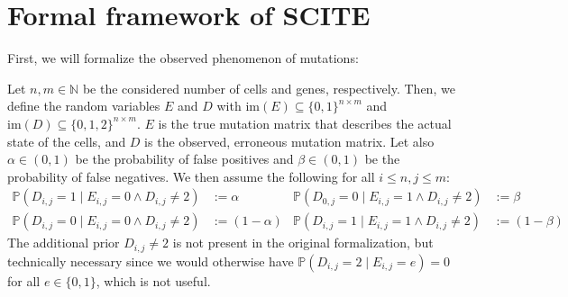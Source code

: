 \section{Formal framework of SCITE}

First, we will formalize the observed phenomenon of mutations:


\begin{definition}
    \label{def:mutmatrix}
    Let $n, m \in \mathbb{N}$ be the considered number of cells and genes, respectively. Then, we define the random variables $E$ and $D$ with $\mathrm{im}(E) \subseteq \{0,1\}^{n \times m}$ and $\mathrm{im}(D) \subseteq \{0, 1, 2\}^{n \times m}$. $E$ is the true mutation matrix that describes the actual state of the cells, and $D$ is the observed, erroneous mutation matrix. Let also $\alpha \in (0,1)$ be the probability of false positives and $\beta \in (0,1)$ be the probability of false negatives. We then assume the following for all $i \leq n, j \leq m$:
    \begin{align*}
        \mathbb{P}(D_{i,j} = 1 \mid E_{i,j} = 0 \wedge D_{i,j} \neq 2) &:= \alpha & \mathbb{P}(D_{0,j} = 0\mid E_{i,j} = 1 \wedge D_{i,j} \neq 2) &:= \beta \\
        \mathbb{P}(D_{i,j} = 0 \mid E_{i,j} = 0 \wedge D_{i,j} \neq 2) &:= (1-\alpha) & \mathbb{P}(D_{i,j} = 1 \mid E_{i,j} = 1 \wedge D_{i,j} \neq 2) &:= (1-\beta)
    \end{align*}
    The additional prior $D_{i,j} \neq 2$ is not present in the original formalization, but technically necessary since we would otherwise have $\mathbb{P}(D_{i,j} = 2 \mid E_{i,j} = e) = 0$ for all $e \in \{0,1\}$, which is not useful.
\end{definition}

